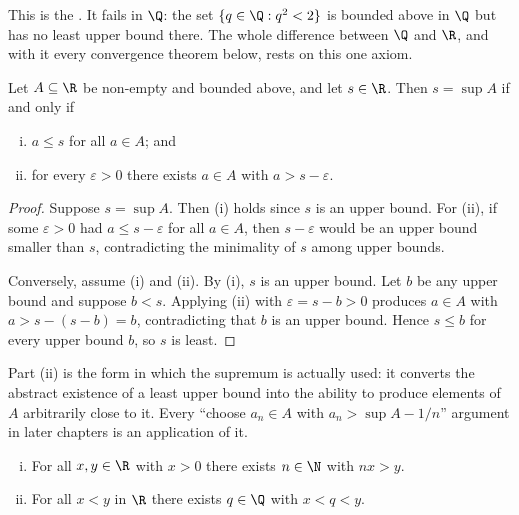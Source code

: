 This is the . It
fails in $\Q$: the set $\{q\in\Q : q^2<2\}$ is bounded above in $\Q$ but has no
least upper bound there. The whole difference between $\Q$ and $\R$, and with it
every convergence theorem below, rests on this one axiom.

\begin{proposition}\label{prop:sup-char}
	Let $A\subseteq\R$ be non-empty and bounded above, and let $s\in\R$. Then
	$s=\sup A$ if and only if
	\begin{enumerate}[(i)]
		\item $a\leq s$ for all $a\in A$; and
		\item for every $\varepsilon>0$ there exists $a\in A$ with $a>s-\varepsilon$.
	\end{enumerate}
\end{proposition}

\begin{proof}
	Suppose $s=\sup A$. Then (i) holds since $s$ is an upper bound. For (ii), if
	some $\varepsilon>0$ had $a\leq s-\varepsilon$ for all $a\in A$, then
	$s-\varepsilon$ would be an upper bound smaller than $s$, contradicting the
	minimality of $s$ among upper bounds.

	Conversely, assume (i) and (ii). By (i), $s$ is an upper bound. Let $b$ be any
	upper bound and suppose $b<s$. Applying (ii) with $\varepsilon=s-b>0$ produces
	$a\in A$ with $a>s-(s-b)=b$, contradicting that $b$ is an upper bound. Hence
	$s\leq b$ for every upper bound $b$, so $s$ is least.
\end{proof}

Part (ii) is the form in which the supremum is actually used: it converts the
abstract existence of a least upper bound into the ability to produce elements of
$A$ arbitrarily close to it. Every ``choose $a_n\in A$ with
$a_n>\sup A-1/n$'' argument in later chapters is an application of it.

\begin{proposition}\label{prop:archimedean}
	\begin{enumerate}[(i)]
		\item For all $x,y\in\R$ with $x>0$ there exists $n\in\N$ with $nx>y$.
		\item For all $x<y$ in $\R$ there exists $q\in\Q$ with $x<q<y$.
	\end{enumerate}
\end{proposition}

